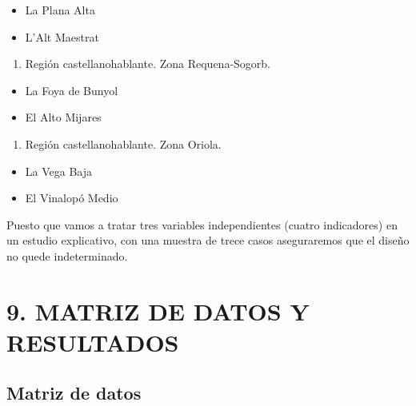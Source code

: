 \documentclass[
]{article}
\providecommand{\tightlist}{%
  \setlength{\itemsep}{0pt}\setlength{\parskip}{0pt}}
\begin{document}
\begin{itemize}
\tightlist
\item
  La Plana Alta
\item
  L'Alt Maestrat
\end{itemize}

\begin{enumerate}
\def\labelenumi{\arabic{enumi}.}
\setcounter{enumi}{5}
\tightlist
\item
  Región castellanohablante. Zona Requena-Sogorb.
\end{enumerate}

\begin{itemize}
\tightlist
\item
  La Foya de Bunyol
\item
  El Alto Mijares
\end{itemize}

\begin{enumerate}
\def\labelenumi{\arabic{enumi}.}
\setcounter{enumi}{6}
\tightlist
\item
  Región castellanohablante. Zona Oriola.
\end{enumerate}

\begin{itemize}
\tightlist
\item
  La Vega Baja
\item
  El Vinalopó Medio
\end{itemize}

Puesto que vamos a tratar tres variables independientes (cuatro
indicadores) en un estudio explicativo, con una muestra de trece casos
aseguraremos que el diseño no quede indeterminado.

\hypertarget{matriz-de-datos-y-resultados}{%
\section{9. MATRIZ DE DATOS Y
RESULTADOS}\label{matriz-de-datos-y-resultados}}

\hypertarget{matriz-de-datos}{%
\subsection{Matriz de datos}\label{matriz-de-datos}}
\end{document}
